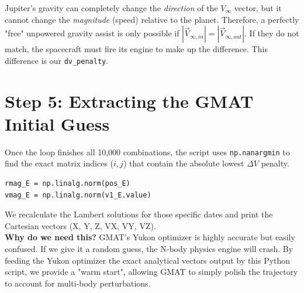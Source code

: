\documentclass[11pt, letterpaper]{article}
\begin{document}
\begin{tcolorbox}[colback=blue!5!white,colframe=blue!75!black,title=The Golden Rule of Gravity Assists]
Jupiter's gravity can completely change the \textit{direction} of the $V_\infty$ vector, but it cannot change the \textit{magnitude} (speed) relative to the planet. Therefore, a perfectly "free" unpowered gravity assist is only possible if $|\vec{V}_{\infty, in}| = |\vec{V}_{\infty, out}|$. If they do not match, the spacecraft must fire its engine to make up the difference. This difference is our \texttt{dv\_penalty}.
\end{tcolorbox}

\section*{Step 5: Extracting the GMAT Initial Guess}
Once the loop finishes all 10,000 combinations, the script uses \texttt{np.nanargmin} to find the exact matrix indices ($i, j$) that contain the absolute lowest $\Delta V$ penalty. 

\begin{lstlisting}[numbers=none]
rmag_E = np.linalg.norm(pos_E)
vmag_E = np.linalg.norm(v1_E.value)
\end{lstlisting}

We recalculate the Lambert solutions for those specific dates and print the Cartesian vectors (X, Y, Z, VX, VY, VZ). 
\\
\textbf{Why do we need this?} GMAT's Yukon optimizer is highly accurate but easily confused. If we give it a random guess, the N-body physics engine will crash. By feeding the Yukon optimizer the exact analytical vectors output by this Python script, we provide a "warm start", allowing GMAT to simply polish the trajectory to account for multi-body perturbations.
\end{document}
